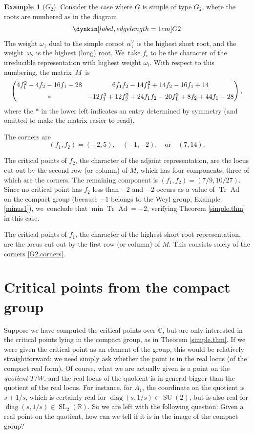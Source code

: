 \documentclass[JEP,XML,SOM,Unicode,NoFloatCountersInSection,published]{cedram}
\theoremstyle{definition}
\newtheorem{example}[equation]{Example}
\newcommand{\R}{\mathbb{R}}
\newcommand{\C}{\mathbb{C}}
\DeclareMathOperator{\SL}{SL}
\DeclareMathOperator{\SU}{SU}
\DeclareMathOperator{\Tr}{Tr}
\DeclareMathOperator{\Ad}{Ad}
\DeclareMathOperator{\diag}{diag}
\newcommand{\av}{\alpha^\vee}
\def\edgelen{1cm} %
\begin{document}
\begin{example}[$G_2$] \label{G2.eg}
Consider the case where $G$ is simple of type $G_2$, where the roots are numbered as in the diagram
\[
\dynkin[label,edge length=\edgelen] G2
\]
The weight $\omega_1$ dual to the simple coroot $\av_1$ is the highest short root, and the weight~$\omega_2$ is the highest (long) root. We~take $f_i$ to be the character of the irreducible representation with highest weight $\omega_i$. With respect to this numbering, the matrix~$M$~is
\[\arraycolsep4pt
\begin{pmatrix}
4f_1^2 - 4f_2 - 16 f_1 - 28 & 6f_1f_2 - 14 f_1^2 + 14 f_2 - 16 f_1 + 14 \\[5pt]
* & -12f_1^3 + 12 f_2^2 + 24 f_1 f_2 - 20 f_1^2 + 8 f_2 + 44 f_1 - 28
\end{pmatrix},
\]
where the $*$ in the lower left indicates an entry determined by symmetry (and omitted to make the matrix easier to read).

The corners are
\begin{equation} \label{G2.corners}
(f_1, f_2) =
(-2, 5), \quad (-1, -2), \quad \text{or} \quad (7, 14).
\end{equation}

The critical points of $f_2$, the character of the adjoint representation, are the locus cut out by the second row (or column) of $M$, which has four components, three of which are the corners. The remaining component is $(f_1, f_2) = (7/9, 10/27)$. Since no critical point has $f_2$ less than $-2$ and $-2$ occurs as a value of $\Tr \Ad$ on the compact group (because $-1$ belongs to the Weyl group, Example \ref{minus1}), we~conclude that $\min \Tr \Ad = -2$, verifying Theorem \ref{simple.thm} in this case.

The critical points of $f_1$, the character of the highest short root representation, are the locus cut out by the first row (or column) of $M$. This consists solely of the corners \eqref{G2.corners}.
\end{example}

\section{Critical points from the compact group} \label{Wders.crit}

Suppose we have computed the
critical points over $\C$, but are only interested in the critical points
lying in the compact group, as in Theorem \ref{simple.thm}.
If we were given the critical point as an
element of the group, this would be relatively straightforward: we need
simply ask whether the point is in the real locus (of the compact real
form). Of course, what we are actually given is a point on the {\em
quotient} $T/W$, and the real locus of the quotient is in general bigger than
the quotient of the real locus. For instance, for $A_1$, the
coordinate on the quotient is $s+1/s$, which is certainly real
for $\diag(s, 1/s) \in \SU(2)$, but is also real for $\diag(s, 1/s) \in \SL_2(\R)$.
So we are left with the following question: Given a real point on the
quotient, how can we tell if it is in the image of the compact group?
\end{document}
